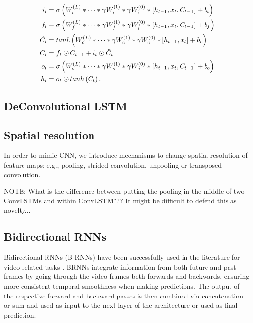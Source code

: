 \begin{equation}
\begin{split}
    i_t &= \sigma\left(W_i^{(L)} * \dots * \gamma W_i^{(1)} *
        \gamma W_i^{(0)} * \left[h_{t-1}, x_t, C_{t-1}\right] + b_i \right)\\
    f_t &= \sigma\left(W_f^{(L)} * \dots * \gamma W_f^{(1)} *
        \gamma W_f^{(0)} * \left[h_{t-1}, x_t, C_{t-1}\right] + b_f \right)\\
    \tilde C_t &= tanh \left(W_c^{(L)} * \dots * \gamma W_c^{(1)} *
        \gamma W_c^{(0)} * \left[h_{t-1}, x_t\right] + b_c \right)\\
    C_t &= f_t \odot C_{t-1} + i_t \odot \tilde C_t\\
    o_t &= \sigma\left(W_o^{(L)} * \dots * \gamma W_o^{(1)} *
        \gamma W_o^{(0)} * \left[h_{t-1}, x_t, C_{t-1}\right] + b_o \right)\\
    h_t &= o_t \odot tanh \left(C_t\right).
\end{split}
\end{equation}

\subsection{DeConvolutional LSTM}

\subsection{Spatial resolution}
In order to mimic CNN, we introduce mechanisms to change spatial resolution of
feature maps: e.g., pooling, strided convolution, unpooling or transposed
convolution.

NOTE: What is the difference between putting the pooling in the middle of two
ConvLSTMs and within ConvLSTM??? It might be difficult to defend this as
novelty...

\subsection{Bidirectional RNNs}
Bidirectional RNNs (B-RNNs) \cite{Schuster1997bidirecrnn} have been
successfully used in the literature for video related tasks \cite{Du2015_CVPR}.
BRNNs integrate information from both future and past frames by going through
the video frames both forwards and backwards, ensuring more consistent temporal
smoothness when making predictions. The output of the respective forward and
backward passes is then combined via concatenation or sum and used as input to
the next layer of the architecture or used as final prediction.

